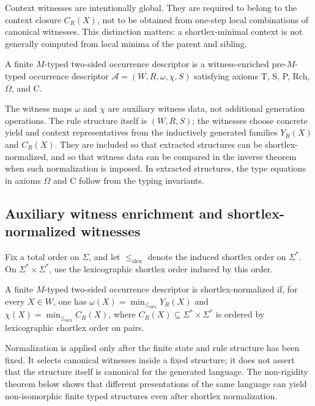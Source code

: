 \documentclass[sub]{jalc}
\newcommand{\slex}{\leq_{\mathrm{slex}}}
\newcommand{\A}{\mathcal A}
\begin{document}
Context witnesses are intentionally global. They are required to belong to the context closure \(C_R(X)\), not to be obtained from one-step local combinations of canonical witnesses. This distinction matters: a shortlex-minimal context is not generally computed from local minima of the parent and sibling.

\begin{definition}
\label{def:typed-context-structure}
A finite \(M\)-typed two-sided occurrence descriptor is a witness-enriched pre-\(M\)-typed occurrence descriptor \(\A=(W,R,\omega,\chi,S)\) satisfying axioms T, S, P, Rch, \(\Omega\), and C.
\end{definition}

The witness maps \(\omega\) and \(\chi\) are auxiliary witness data, not additional generation operations. The rule structure itself is \((W,R,S)\); the witnesses choose concrete yield and context representatives from the inductively generated families \(Y_R(X)\) and \(C_R(X)\). They are included so that extracted structures can be shortlex-normalized, and so that witness data can be compared in the inverse theorem when such normalization is imposed. In extracted structures, the type equations in axioms \(\Omega\) and C follow from the typing invariants.


\subsection{Auxiliary witness enrichment and shortlex-normalized witnesses}

Fix a total order on \(\Sigma\), and let \(\slex\) denote the induced shortlex order on \(\Sigma^*\). On \(\Sigma^*\times\Sigma^*\), use the lexicographic shortlex order induced by this order.

\begin{definition}
\label{def:shortlex-normalized-witnesses}
A finite \(M\)-typed two-sided occurrence descriptor is shortlex-normalized if, for every \(X\in W\), one has \(\omega(X)=\min_{\slex}Y_R(X)\) and \(\chi(X)=\min_{\slex}C_R(X)\), where \(C_R(X)\subseteq\Sigma^*\times\Sigma^*\) is ordered by lexicographic shortlex order on pairs.
\end{definition}

Normalization is applied only after the finite state and rule structure has been fixed. It selects canonical witnesses inside a fixed structure; it does not assert that the structure itself is canonical for the generated language. The non-rigidity theorem below shows that different presentations of the same language can yield non-isomorphic finite typed structures even after shortlex normalization.
\end{document}
